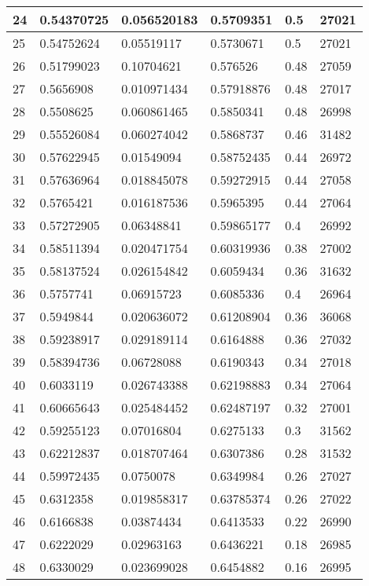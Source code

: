 \begin{longtable}{|l|l|l|l|l|l|}
24 & 0.54370725 & 0.056520183 & 0.5709351 & 0.5 & 27021 \\ \hline 
25 & 0.54752624 & 0.05519117 & 0.5730671 & 0.5 & 27021 \\ \hline 
26 & 0.51799023 & 0.10704621 & 0.576526 & 0.48 & 27059 \\ \hline 
27 & 0.5656908 & 0.010971434 & 0.57918876 & 0.48 & 27017 \\ \hline 
28 & 0.5508625 & 0.060861465 & 0.5850341 & 0.48 & 26998 \\ \hline 
29 & 0.55526084 & 0.060274042 & 0.5868737 & 0.46 & 31482 \\ \hline 
30 & 0.57622945 & 0.01549094 & 0.58752435 & 0.44 & 26972 \\ \hline 
31 & 0.57636964 & 0.018845078 & 0.59272915 & 0.44 & 27058 \\ \hline 
32 & 0.5765421 & 0.016187536 & 0.5965395 & 0.44 & 27064 \\ \hline 
33 & 0.57272905 & 0.06348841 & 0.59865177 & 0.4 & 26992 \\ \hline 
34 & 0.58511394 & 0.020471754 & 0.60319936 & 0.38 & 27002 \\ \hline 
35 & 0.58137524 & 0.026154842 & 0.6059434 & 0.36 & 31632 \\ \hline 
36 & 0.5757741 & 0.06915723 & 0.6085336 & 0.4 & 26964 \\ \hline 
37 & 0.5949844 & 0.020636072 & 0.61208904 & 0.36 & 36068 \\ \hline 
38 & 0.59238917 & 0.029189114 & 0.6164888 & 0.36 & 27032 \\ \hline 
39 & 0.58394736 & 0.06728088 & 0.6190343 & 0.34 & 27018 \\ \hline 
40 & 0.6033119 & 0.026743388 & 0.62198883 & 0.34 & 27064 \\ \hline 
41 & 0.60665643 & 0.025484452 & 0.62487197 & 0.32 & 27001 \\ \hline 
42 & 0.59255123 & 0.07016804 & 0.6275133 & 0.3 & 31562 \\ \hline 
43 & 0.62212837 & 0.018707464 & 0.6307386 & 0.28 & 31532 \\ \hline 
44 & 0.59972435 & 0.0750078 & 0.6349984 & 0.26 & 27027 \\ \hline 
45 & 0.6312358 & 0.019858317 & 0.63785374 & 0.26 & 27022 \\ \hline 
46 & 0.6166838 & 0.03874434 & 0.6413533 & 0.22 & 26990 \\ \hline 
47 & 0.6222029 & 0.02963163 & 0.6436221 & 0.18 & 26985 \\ \hline 
48 & 0.6330029 & 0.023699028 & 0.6454882 & 0.16 & 26995 \\ \hline 

\end{longtable}
